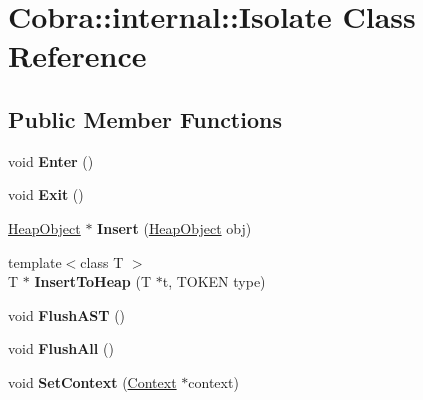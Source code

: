\hypertarget{class_cobra_1_1internal_1_1_isolate}{\section{Cobra\+:\+:internal\+:\+:Isolate Class Reference}
\label{class_cobra_1_1internal_1_1_isolate}
}
\subsection*{Public Member Functions}
\begin{DoxyCompactItemize}
\item 
\hypertarget{class_cobra_1_1internal_1_1_isolate_abc6ce041311035d0e917119f6498d2db}{void {\bfseries Enter} ()}\label{class_cobra_1_1internal_1_1_isolate_abc6ce041311035d0e917119f6498d2db}

\item 
\hypertarget{class_cobra_1_1internal_1_1_isolate_aa966378a720680a07228f9a373ede884}{void {\bfseries Exit} ()}\label{class_cobra_1_1internal_1_1_isolate_aa966378a720680a07228f9a373ede884}

\item 
\hypertarget{class_cobra_1_1internal_1_1_isolate_a9dce7bc569dfe1265e0bf4bb0eabc8b6}{\hyperlink{struct_cobra_1_1internal_1_1_heap_object}{Heap\+Object} $\ast$ {\bfseries Insert} (\hyperlink{struct_cobra_1_1internal_1_1_heap_object}{Heap\+Object} obj)}\label{class_cobra_1_1internal_1_1_isolate_a9dce7bc569dfe1265e0bf4bb0eabc8b6}

\item 
\hypertarget{class_cobra_1_1internal_1_1_isolate_a10d48684b74fcdefaaddb264e2c1d121}{{\footnotesize template$<$class T $>$ }\\T $\ast$ {\bfseries Insert\+To\+Heap} (T $\ast$t, T\+O\+K\+E\+N type)}\label{class_cobra_1_1internal_1_1_isolate_a10d48684b74fcdefaaddb264e2c1d121}

\item 
\hypertarget{class_cobra_1_1internal_1_1_isolate_a87b1ff838a1ae533c775a601ab7dafb2}{void {\bfseries Flush\+A\+S\+T} ()}\label{class_cobra_1_1internal_1_1_isolate_a87b1ff838a1ae533c775a601ab7dafb2}

\item 
\hypertarget{class_cobra_1_1internal_1_1_isolate_a97a78a3e571d29e9be6ea06c97cb7f33}{void {\bfseries Flush\+All} ()}\label{class_cobra_1_1internal_1_1_isolate_a97a78a3e571d29e9be6ea06c97cb7f33}

\item 
\hypertarget{class_cobra_1_1internal_1_1_isolate_a58d4918a76222420143b75c59e1e9f21}{void {\bfseries Set\+Context} (\hyperlink{class_cobra_1_1internal_1_1_context}{Context} $\ast$context)}\label{class_cobra_1_1internal_1_1_isolate_a58d4918a76222420143b75c59e1e9f21}

\end{DoxyCompactItemize}
